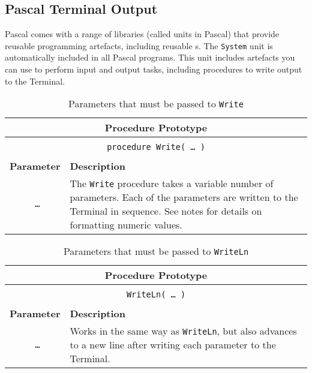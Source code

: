 \clearpage
\subsection{Pascal Terminal Output} %
\label{sub:pascal_console_output}

Pascal comes with a range of libraries (called units in Pascal) that provide reusable programming artefacts, including reusable s. The \texttt{System} unit is automatically included in all Pascal programs. This unit includes artefacts you can use to perform input and output tasks, including procedures to write output to the Terminal.

\begin{table}[h]
  \centering
  \begin{tabular}{|c|p{9cm}|}
    \hline
    \multicolumn{2}{|c|}{\textbf{Procedure Prototype}} \\
    \hline
    \multicolumn{2}{|c|}{} \\
    \multicolumn{2}{|c|}{\texttt{procedure Write( {\ldots} )}} \\
    \multicolumn{2}{|c|}{} \\
    \hline
    \textbf{Parameter} & \textbf{Description} \\
    \hline
    \texttt{ \ldots } & The \texttt{Write} procedure takes a variable number of parameters. Each of the parameters are written to the Terminal in sequence. See notes for details on formatting numeric values. \\
    \hline
  \end{tabular}
  \caption{Parameters that must be passed to \texttt{Write}}
  \label{tbl:program-creation-pas write parameters}
\end{table}

\begin{table}[h]
  \centering
  \begin{tabular}{|c|p{9cm}|}
    \hline
    \multicolumn{2}{|c|}{\textbf{Procedure Prototype}} \\
    \hline
    \multicolumn{2}{|c|}{} \\
    \multicolumn{2}{|c|}{\texttt{WriteLn( {\ldots} )}} \\
    \multicolumn{2}{|c|}{} \\
    \hline
    \textbf{Parameter} & \textbf{Description} \\
    \hline
    \texttt{ \ldots } & Works in the same way as \texttt{WriteLn}, but also advances to a new line after writing each parameter to the Terminal. \\
    \hline
  \end{tabular}
  \caption{Parameters that must be passed to \texttt{WriteLn}}
  \label{tbl:program-creation-pas writeln parameters}
\end{table}

